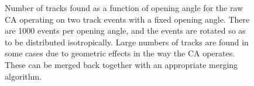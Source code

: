 \begin{figure}
\centering
\caption[Track count as a function of angle for raw CA operating on toy MC events]{\label{fig:ca_toy_raw_trackcounts}Number of tracks found as a function of opening angle for the raw \ac{CA} operating on two track events with a fixed opening angle. There are 1000 events per opening angle, and the events are rotated so as to be distributed isotropically. Large numbers of tracks are found in some cases due to geometric effects in the way the \ac{CA} operates. These can be merged back together with an appropriate merging algorithm.}
\end{figure}


